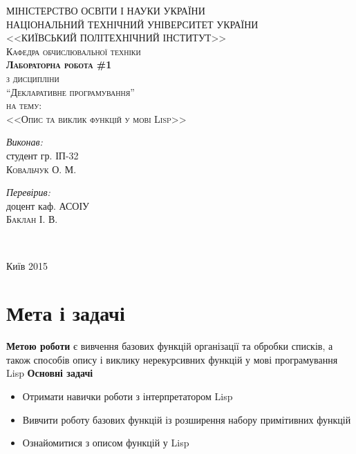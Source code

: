 \documentclass[a4paper, 10pt]{extarticle}
\begin{document}
\begin{titlepage}
  \thispagestyle{empty}
  \center
  \textsc{\uppercase{Міністерство освіти і науки України\\Національний технічний університет України\\<<Київський політехнічний інститут>>}}\\[1cm]
  \textsc{Кафедра обчислювальної техніки}\\[0.5cm]
  \vfill
  \textsc{\Large \textbf{Лабораторна робота \#1}}\\
  \textsc{з дисципліни}\\
  \textsc{\large ``Декларативне програмування''}\\
  \textsc{на тему:}\\
  \textsc{\Large <<Опис та виклик функцій у мові Lisp>>}\\
  \vspace{3cm}
  \begin{minipage}{0.4\textwidth}
    \begin{flushleft} \large
      \emph{Виконав:}\\
      студент гр. ІП-32 \\
      \textsc{Ковальчук О. М.} %
    \end{flushleft}
  \end{minipage}
  \begin{minipage}{0.4\textwidth}
    \begin{flushright} \large
      \emph{Перевірив:} \\
      доцент каф. АСОІУ \\
      \textsc{Баклан І. В.} %
    \end{flushright}
  \end{minipage}\\[4cm]
  \vfill

  Київ 2015
\end{titlepage}
\setcounter{page}{2}
\section{Мета і задачі}
\textbf{Метою роботи} є вивчення базових функцій організації та обробки списків, а також способів опису і виклику нерекурсивних функцій у мові програмування Lisp
\textbf{Основні задачі}
\begin{itemize}
  \item Отримати навички роботи з інтерпретатором Lisp
  \item Вивчити роботу базових функцій із розширення набору примітивних функцій
  \item Ознайомитися з описом функцій у Lisp
\end{itemize}
\end{document}
